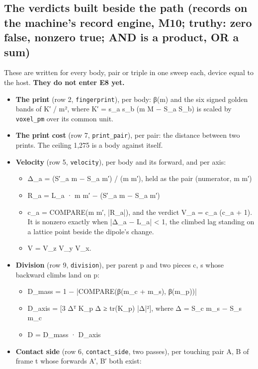 \subsection{\texorpdfstring{The verdicts built beside the path (records on the machine's record engine, M10; truthy: zero false, nonzero true; AND is a product, OR a sum)}{The verdicts built beside the path (records on the machine's record engine, M10; truthy: zero false, nonzero true; AND is a product, OR a sum)}}

These are written for every body, pair or triple in one sweep each, device equal to the host. \textbf{They do not enter E8 yet.}

\begin{itemize}
\item \textbf{The print} (row 2, \texttt{fingerprint}), per body: β(m) and the six signed golden bands of K′ / m², where K′ = s\_\allowbreak{}a s\_\allowbreak{}b (m M − S\_\allowbreak{}a S\_\allowbreak{}b) is scaled by \texttt{voxel\_\allowbreak{}pm} over its common unit.
\item \textbf{The print cost} (row 7, \texttt{print\_\allowbreak{}pair}), per pair: the distance between two prints. The ceiling 1,275 is a body against itself.
\item \textbf{Velocity} (row 5, \texttt{velocity}), per body and its forward, and per axis:

\begin{itemize}
\item Δ\_\allowbreak{}a = (S′\_\allowbreak{}a m − S\_\allowbreak{}a m′) / (m m′), held as the pair (numerator, m m′)
\item R\_\allowbreak{}a = L\_\allowbreak{}a · m m′ − (S′\_\allowbreak{}a m − S\_\allowbreak{}a m′)
\item c\_\allowbreak{}a = COMPARE(m m′, |R\_\allowbreak{}a|), and the verdict V\_\allowbreak{}a = c\_\allowbreak{}a (c\_\allowbreak{}a + 1). It is nonzero exactly when |Δ\_\allowbreak{}a − L\_\allowbreak{}a| < 1, the climbed lag standing on a lattice point beside the dipole's change.
\item V = V\_\allowbreak{}z V\_\allowbreak{}y V\_\allowbreak{}x.
\end{itemize}
\item \textbf{Division} (row 9, \texttt{division}), per parent p and two pieces c, s whose backward climbs land on p:

\begin{itemize}
\item D\_\allowbreak{}mass = 1 − |COMPARE(β(m\_\allowbreak{}c + m\_\allowbreak{}s), β(m\_\allowbreak{}p))|
\item D\_\allowbreak{}axis = [3 Δᵀ K\_\allowbreak{}p Δ ≥ tr(K\_\allowbreak{}p) |Δ|²], where Δ = S\_\allowbreak{}c m\_\allowbreak{}s − S\_\allowbreak{}s m\_\allowbreak{}c
\item D = D\_\allowbreak{}mass · D\_\allowbreak{}axis
\end{itemize}
\item \textbf{Contact side} (row 6, \texttt{contact\_\allowbreak{}side}, two passes), per touching pair A, B of frame t whose forwards A′, B′ both exist:


\end{itemize}
